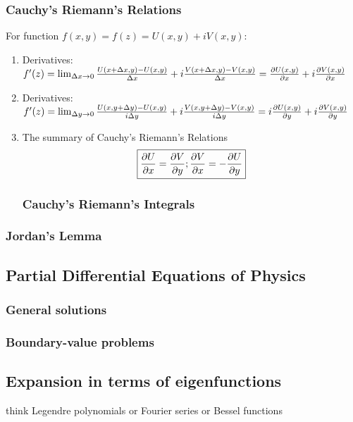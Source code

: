 \documentclass[]{article}
\begin{document}
\subsubsection{Cauchy's Riemann's Relations}
For function $f(x,y)=f(z)= U(x,y)+ iV(x,y)$: 
\begin{enumerate}
  \item Derivatives: $f'(z)= \lim_{\Delta x\to 0} \frac{U(x+\Delta x, y)-U(x,y)}{\Delta x} + i\frac{V(x+\Delta x, y)-V(x,y)}{\Delta x}= \pdv{U(x,y)}{x}+i\pdv{V(x,y)}{x}$
   \item Derivatives: $f'(z)= \lim_{\Delta y\to 0} \frac{U(x, y+\Delta y)-U(x,y)}{i\Delta y} + i\frac{V(x, y+\Delta y)-V(x,y)}{i\Delta y}= i\pdv{U(x,y)}{y}+i\pdv{V(x,y)}{y}$
   \item The summary of Cauchy's Riemann's Relations \[
 \boxed{\pdv{U}{x}=\pdv{V}{y} ;\pdv{V}{x}=-\pdv{U}{y} } 
 \]
 
\subsubsection{Cauchy's Riemann's Integrals}
\end{enumerate}

\subsubsection{Jordan's Lemma}

\subsection{Partial Differential Equations of Physics}
\subsubsection{General solutions}
\subsubsection{Boundary-value problems}

\subsection{Expansion in terms of eigenfunctions}
think Legendre polynomials or Fourier series or Bessel functions
\end{document}
